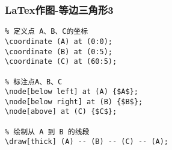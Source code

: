 \begin{frame}[fragile]
\frametitle{LaTex作图-等边三角形3}

\begin{lstlisting}
% 定义点 A、B、C的坐标
\coordinate (A) at (0:0);
\coordinate (B) at (0:5);
\coordinate (C) at (60:5);

% 标注点A、B、C
\node[below left] at (A) {$A$};
\node[below right] at (B) {$B$};
\node[above] at (C) {$C$};

% 绘制从 A 到 B 的线段
\draw[thick] (A) -- (B) -- (C) -- (A);
\end{lstlisting}
\end{frame}
